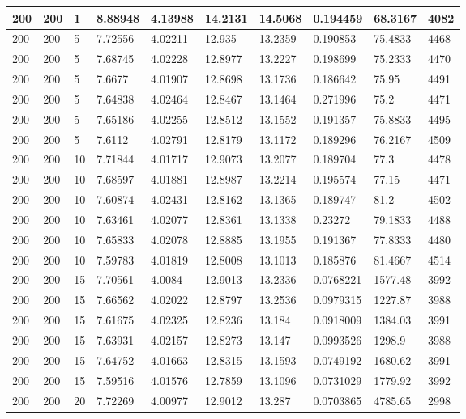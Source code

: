 \begin{landscape}
\begin{longtable}{ | l | l | l | l | l | l | l | l | l | l | }
200 & 200 & 1 & 8.88948 & 4.13988 & 14.2131 & 14.5068 & 0.194459 & 68.3167 & 4082\\ \hline
200 & 200 & 5 & 7.72556 & 4.02211 & 12.935 & 13.2359 & 0.190853 & 75.4833 & 4468\\ \hline
200 & 200 & 5 & 7.68745 & 4.02228 & 12.8977 & 13.2227 & 0.198699 & 75.2333 & 4470\\ \hline
200 & 200 & 5 & 7.6677 & 4.01907 & 12.8698 & 13.1736 & 0.186642 & 75.95 & 4491\\ \hline
200 & 200 & 5 & 7.64838 & 4.02464 & 12.8467 & 13.1464 & 0.271996 & 75.2 & 4471\\ \hline
200 & 200 & 5 & 7.65186 & 4.02255 & 12.8512 & 13.1552 & 0.191357 & 75.8833 & 4495\\ \hline
200 & 200 & 5 & 7.6112 & 4.02791 & 12.8179 & 13.1172 & 0.189296 & 76.2167 & 4509\\ \hline
200 & 200 & 10 & 7.71844 & 4.01717 & 12.9073 & 13.2077 & 0.189704 & 77.3 & 4478\\ \hline
200 & 200 & 10 & 7.68597 & 4.01881 & 12.8987 & 13.2214 & 0.195574 & 77.15 & 4471\\ \hline
200 & 200 & 10 & 7.60874 & 4.02431 & 12.8162 & 13.1365 & 0.189747 & 81.2 & 4502\\ \hline
200 & 200 & 10 & 7.63461 & 4.02077 & 12.8361 & 13.1338 & 0.23272 & 79.1833 & 4488\\ \hline
200 & 200 & 10 & 7.65833 & 4.02078 & 12.8885 & 13.1955 & 0.191367 & 77.8333 & 4480\\ \hline
200 & 200 & 10 & 7.59783 & 4.01819 & 12.8008 & 13.1013 & 0.185876 & 81.4667 & 4514\\ \hline
200 & 200 & 15 & 7.70561 & 4.0084 & 12.9013 & 13.2336 & 0.0768221 & 1577.48 & 3992\\ \hline
200 & 200 & 15 & 7.66562 & 4.02022 & 12.8797 & 13.2536 & 0.0979315 & 1227.87 & 3988\\ \hline
200 & 200 & 15 & 7.61675 & 4.02325 & 12.8236 & 13.184 & 0.0918009 & 1384.03 & 3991\\ \hline
200 & 200 & 15 & 7.63931 & 4.02157 & 12.8273 & 13.147 & 0.0993526 & 1298.9 & 3988\\ \hline
200 & 200 & 15 & 7.64752 & 4.01663 & 12.8315 & 13.1593 & 0.0749192 & 1680.62 & 3991\\ \hline
200 & 200 & 15 & 7.59516 & 4.01576 & 12.7859 & 13.1096 & 0.0731029 & 1779.92 & 3992\\ \hline
200 & 200 & 20 & 7.72269 & 4.00977 & 12.9012 & 13.287 & 0.0703865 & 4785.65 & 2998\\ \hline

\end{longtable}
\end{landscape}
